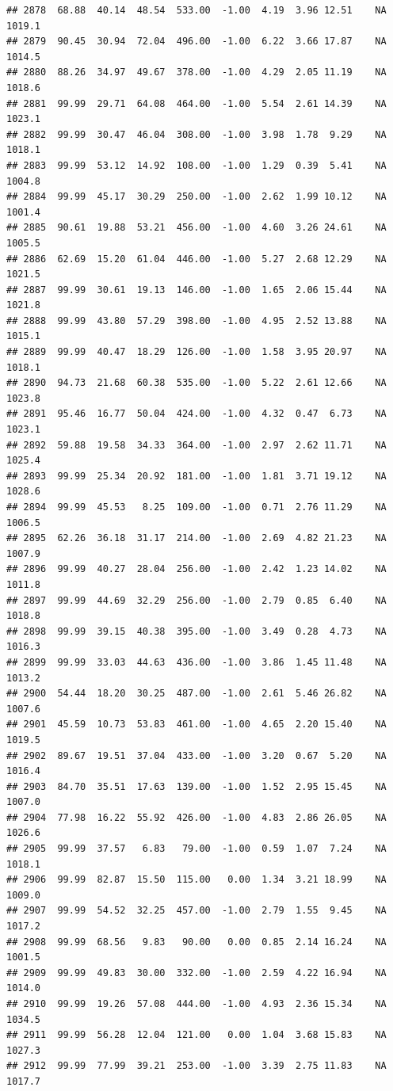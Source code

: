 \documentclass{article}\usepackage{graphicx, color}
\makeatletter
\newenvironment{kframe}{%
 \def\at@end@of@kframe{}%
 \ifinner\ifhmode%
  \def\at@end@of@kframe{\end{minipage}}%
  \begin{minipage}{\columnwidth}%
 \fi\fi%
 \def\FrameCommand##1{\hskip\@totalleftmargin \hskip-\fboxsep
 \colorbox{shadecolor}{##1}\hskip-\fboxsep
     \hskip-\linewidth \hskip-\@totalleftmargin \hskip\columnwidth}%
 \MakeFramed {\advance\hsize-\width
   \@totalleftmargin\z@ \linewidth\hsize
   \@setminipage}}%
 {\par\unskip\endMakeFramed%
 \at@end@of@kframe}
\newenvironment{knitrout}{}{} %
\makeatother
\begin{document}
\begin{knitrout}
\begin{kframe}
\begin{verbatim}
## 2878  68.88  40.14  48.54  533.00  -1.00  4.19  3.96 12.51    NA 1019.1
## 2879  90.45  30.94  72.04  496.00  -1.00  6.22  3.66 17.87    NA 1014.5
## 2880  88.26  34.97  49.67  378.00  -1.00  4.29  2.05 11.19    NA 1018.6
## 2881  99.99  29.71  64.08  464.00  -1.00  5.54  2.61 14.39    NA 1023.1
## 2882  99.99  30.47  46.04  308.00  -1.00  3.98  1.78  9.29    NA 1018.1
## 2883  99.99  53.12  14.92  108.00  -1.00  1.29  0.39  5.41    NA 1004.8
## 2884  99.99  45.17  30.29  250.00  -1.00  2.62  1.99 10.12    NA 1001.4
## 2885  90.61  19.88  53.21  456.00  -1.00  4.60  3.26 24.61    NA 1005.5
## 2886  62.69  15.20  61.04  446.00  -1.00  5.27  2.68 12.29    NA 1021.5
## 2887  99.99  30.61  19.13  146.00  -1.00  1.65  2.06 15.44    NA 1021.8
## 2888  99.99  43.80  57.29  398.00  -1.00  4.95  2.52 13.88    NA 1015.1
## 2889  99.99  40.47  18.29  126.00  -1.00  1.58  3.95 20.97    NA 1018.1
## 2890  94.73  21.68  60.38  535.00  -1.00  5.22  2.61 12.66    NA 1023.8
## 2891  95.46  16.77  50.04  424.00  -1.00  4.32  0.47  6.73    NA 1023.1
## 2892  59.88  19.58  34.33  364.00  -1.00  2.97  2.62 11.71    NA 1025.4
## 2893  99.99  25.34  20.92  181.00  -1.00  1.81  3.71 19.12    NA 1028.6
## 2894  99.99  45.53   8.25  109.00  -1.00  0.71  2.76 11.29    NA 1006.5
## 2895  62.26  36.18  31.17  214.00  -1.00  2.69  4.82 21.23    NA 1007.9
## 2896  99.99  40.27  28.04  256.00  -1.00  2.42  1.23 14.02    NA 1011.8
## 2897  99.99  44.69  32.29  256.00  -1.00  2.79  0.85  6.40    NA 1018.8
## 2898  99.99  39.15  40.38  395.00  -1.00  3.49  0.28  4.73    NA 1016.3
## 2899  99.99  33.03  44.63  436.00  -1.00  3.86  1.45 11.48    NA 1013.2
## 2900  54.44  18.20  30.25  487.00  -1.00  2.61  5.46 26.82    NA 1007.6
## 2901  45.59  10.73  53.83  461.00  -1.00  4.65  2.20 15.40    NA 1019.5
## 2902  89.67  19.51  37.04  433.00  -1.00  3.20  0.67  5.20    NA 1016.4
## 2903  84.70  35.51  17.63  139.00  -1.00  1.52  2.95 15.45    NA 1007.0
## 2904  77.98  16.22  55.92  426.00  -1.00  4.83  2.86 26.05    NA 1026.6
## 2905  99.99  37.57   6.83   79.00  -1.00  0.59  1.07  7.24    NA 1018.1
## 2906  99.99  82.87  15.50  115.00   0.00  1.34  3.21 18.99    NA 1009.0
## 2907  99.99  54.52  32.25  457.00  -1.00  2.79  1.55  9.45    NA 1017.2
## 2908  99.99  68.56   9.83   90.00   0.00  0.85  2.14 16.24    NA 1001.5
## 2909  99.99  49.83  30.00  332.00  -1.00  2.59  4.22 16.94    NA 1014.0
## 2910  99.99  19.26  57.08  444.00  -1.00  4.93  2.36 15.34    NA 1034.5
## 2911  99.99  56.28  12.04  121.00   0.00  1.04  3.68 15.83    NA 1027.3
## 2912  99.99  77.99  39.21  253.00  -1.00  3.39  2.75 11.83    NA 1017.7

\end{verbatim}
\end{kframe}
\end{knitrout}
\end{document}

